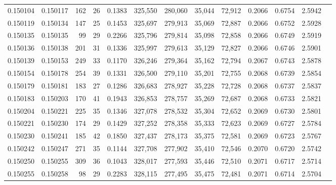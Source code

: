\begin{tabular}{rrrrrrrrrrrrr}
0.150104 & 0.150117 &   162 &  26 &                                     0.1383 & 325,550 & 280,060 &  35,044 &  72,912 & 0.2066 & 0.6754 & 2.5942 \\
0.150119 & 0.150134 &   147 &  25 &                                     0.1453 & 325,697 & 279,913 &  35,069 &  72,887 & 0.2066 & 0.6752 & 2.5928 \\
0.150135 & 0.150135 &    99 &  29 &                                     0.2266 & 325,796 & 279,814 &  35,098 &  72,858 & 0.2066 & 0.6749 & 2.5919 \\
0.150136 & 0.150138 &   201 &  31 &                                     0.1336 & 325,997 & 279,613 &  35,129 &  72,827 & 0.2066 & 0.6746 & 2.5901 \\
0.150139 & 0.150153 &   249 &  33 &                                     0.1170 & 326,246 & 279,364 &  35,162 &  72,794 & 0.2067 & 0.6743 & 2.5878 \\
0.150154 & 0.150178 &   254 &  39 &                                     0.1331 & 326,500 & 279,110 &  35,201 &  72,755 & 0.2068 & 0.6739 & 2.5854 \\
0.150179 & 0.150181 &   183 &  27 &                                     0.1286 & 326,683 & 278,927 &  35,228 &  72,728 & 0.2068 & 0.6737 & 2.5837 \\
0.150183 & 0.150203 &   170 &  41 &                                     0.1943 & 326,853 & 278,757 &  35,269 &  72,687 & 0.2068 & 0.6733 & 2.5821 \\
0.150204 & 0.150221 &   225 &  35 &                                     0.1346 & 327,078 & 278,532 &  35,304 &  72,652 & 0.2069 & 0.6730 & 2.5801 \\
0.150221 & 0.150230 &   174 &  29 &                                     0.1429 & 327,252 & 278,358 &  35,333 &  72,623 & 0.2069 & 0.6727 & 2.5784 \\
0.150230 & 0.150241 &   185 &  42 &                                     0.1850 & 327,437 & 278,173 &  35,375 &  72,581 & 0.2069 & 0.6723 & 2.5767 \\
0.150242 & 0.150247 &   271 &  35 &                                     0.1144 & 327,708 & 277,902 &  35,410 &  72,546 & 0.2070 & 0.6720 & 2.5742 \\
0.150250 & 0.150255 &   309 &  36 &                                     0.1043 & 328,017 & 277,593 &  35,446 &  72,510 & 0.2071 & 0.6717 & 2.5714 \\
0.150255 & 0.150258 &    98 &  29 &                                     0.2283 & 328,115 & 277,495 &  35,475 &  72,481 & 0.2071 & 0.6714 & 2.5704 \\

\end{tabular}
